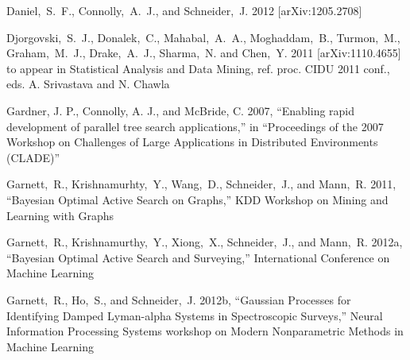 \documentclass[prd,nofootbib,floatfix,11pt,tightenlines]{revtex4}
\begin{document}
\begin{thebibliography}{99}
Daniel,~S.~F., Connolly,~A.~J., and Schneider,~J. 2012
[arXiv:1205.2708]





Djorgovski,~S.~J., Donalek,~C., Mahabal,~A.~A., Moghaddam,~B., Turmon,~M.,
Graham,~M.~J., Drake,~A.~J., Sharma,~N. and Chen,~Y. 2011
[arXiv:1110.4655] to appear in Statistical Analysis and Data Mining, ref. proc.
CIDU 2011 conf., eds. A. Srivastava and N. Chawla


Gardner, J. P., Connolly, A. J., and McBride, C. 2007,
``Enabling rapid development of parallel tree search applications,''
in ``Proceedings of the 2007 Workshop on Challenges of Large Applications in Distributed
Environments (CLADE)''

Garnett,~R., Krishnamurhty,~Y., Wang,~D., Schneider,~J., and Mann,~R. 2011,
``Bayesian Optimal Active Search on Graphs,'' KDD Workshop on Mining and
Learning with Graphs

Garnett,~R., Krishnamurthy,~Y., Xiong,~X., Schneider,~J., and Mann,~R. 2012a,
``Bayesian Optimal Active Search and Surveying,'' International Conference on
Machine Learning

Garnett,~R., Ho,~S., and Schneider,~J. 2012b,
``Gaussian Processes for Identifying Damped Lyman-alpha Systems in Spectroscopic
Surveys,'' Neural Information Processing Systems 
workshop on Modern Nonparametric Methods in Machine Learning


\end{thebibliography}
\end{document}
